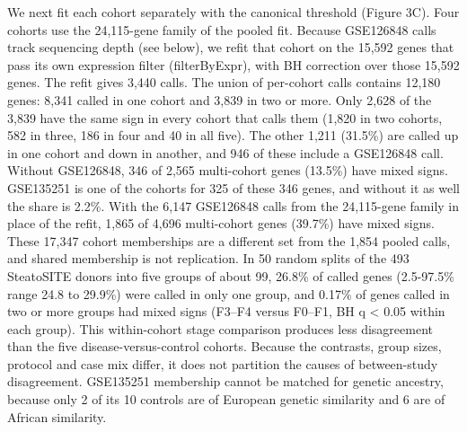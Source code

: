 We next fit each cohort separately with the canonical threshold (Figure 3C). Four cohorts use the 24,115-gene family of the pooled fit. Because GSE126848 calls track sequencing depth (see below), we refit that cohort on the 15,592 genes that pass its own expression filter (filterByExpr), with BH correction over those 15,592 genes. The refit gives 3,440 calls. The union of per-cohort calls contains 12,180 genes: 8,341 called in one cohort and 3,839 in two or more. Only 2,628 of the 3,839 have the same sign in every cohort that calls them (1,820 in two cohorts, 582 in three, 186 in four and 40 in all five). The other 1,211 (31.5\%) are called up in one cohort and down in another, and 946 of these include a GSE126848 call. Without GSE126848, 346 of 2,565 multi-cohort genes (13.5\%) have mixed signs. GSE135251 is one of the cohorts for 325 of these 346 genes, and without it as well the share is 2.2\%. With the 6,147 GSE126848 calls from the 24,115-gene family in place of the refit, 1,865 of 4,696 multi-cohort genes (39.7\%) have mixed signs. These 17,347 cohort memberships are a different set from the 1,854 pooled calls, and shared membership is not replication. In 50 random splits of the 493 SteatoSITE donors into five groups of about 99, 26.8\% of called genes (2.5-97.5\% range 24.8 to 29.9\%) were called in only one group, and 0.17\% of genes called in two or more groups had mixed signs (F3--F4 versus F0--F1, BH q \textless{} 0.05 within each group). This within-cohort stage comparison produces less disagreement than the five disease-versus-control cohorts. Because the contrasts, group sizes, protocol and case mix differ, it does not partition the causes of between-study disagreement. GSE135251 membership cannot be matched for genetic ancestry, because only 2 of its 10 controls are of European genetic similarity and 6 are of African similarity.



